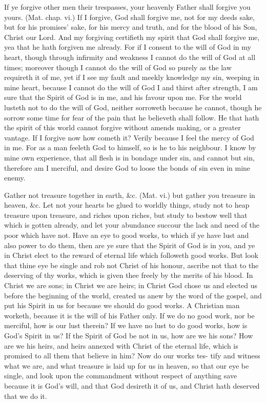 If ye forgive other men their trespasses, your heavenly 
Father shall forgive you yours. (Mat. chap. vi.) If I 
forgive, God shall forgive me, not for my deeds sake, but 
for his promises' sake, for his mercy and truth, and for the 
blood of his Son, Christ our Lord. And my forgiving
certifieth my spirit that God shall forgive me, yea that he
hath forgiven me already. For if I consent to the will of
God in my heart, though through infirmity and weakness 
I cannot do the will of God at all times; moreover though 
I cannot do the will of God so purely as the law requireth 
it of me, yet if I see my fault and meekly knowledge my 
sin, weeping in mine heart, because I cannot do the will of 
God I and thirst after strength, I am sure that the Spirit of 
God is in me, and his favour upon me. For the world 
lusteth not to do the will of God, neither sorroweth because 
he cannot, though he sorrow some time for fear of the pain 
that he believeth shall follow. He that hath the spirit of 
this world cannot forgive without amends making, or a 
greater vantage. If I forgive now how cometh it? Verily 
because I feel the mercy of God in me. For as a man 
feeleth God to himself, so is he to his neighbour. I know 
by mine own experience, that all flesh is in bondage under 
sin, and cannot but sin, therefore am I merciful, and desire 
God to loose the bonds of sin even in mine enemy. 


Gather not treasure together in earth, \&c. (Mat. vi.)
but gather you treasure in heaven, \&c. Let not your 
hearts be glued to worldly things, study not to heap treasure 
upon treasure, and riches upon riches, but study to bestow 
well that which is gotten already, and let your abundance 
succour the lack and need of the poor which have not. 
Have an eye to good works, to which if ye have lust 
and also power to do them, then are ye sure that the Spirit 
of God is in you, and ye in Christ elect to the reward of 
eternal life which followeth good works. But look that 
thine eye be single and rob not Christ of his honour, 
ascribe not that to the deserving of thy works, which is 
given thee freely by the merits of his blood. In Christ we 
are sons; in Christ we are heirs; in Christ God chose us 
and elected us before the beginning of the world, created 
us anew by the word of the gospel, and put his Spirit in 
us for because we should do good works. A Christian 
man worketh, because it is the will of his Father only. 
If we do no good work, nor be merciful, how is our lust 
therein? If we have no lust to do good works, how is 
God's Spirit in us? If the Spirit of God be not in us, 
how are we his sons? How are we his heirs, and heirs 
annexed with Christ of the eternal life, which is promised 
to all them that believe in him? Now do our works tes- 
tify and witness what we are, and what treasure is laid up 
for us in heaven, so that our eye be single, and look upon 
the commandment without respect of anything save because 
it is God's will, and that God desireth it of us, and Christ 
hath deserved that we do it. 

